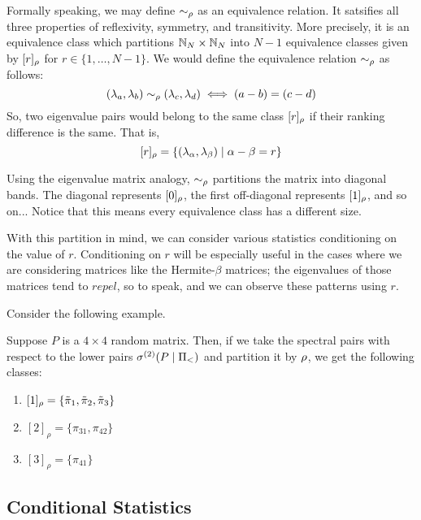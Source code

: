\begin{remark}
Formally speaking, we may define $\sim_{\rho}$ as an equivalence relation. It satsifies all three properties of reflexivity, symmetry, and transitivity. More precisely, it is an equivalence class which partitions $\mathbb{N}_N \times \mathbb{N}_N$ into $N - 1$ equivalence classes given by $[r]_{\rho}$ for $r \in \{1, \dots, N-1\}$. We would define the equivalence relation $\sim_{\rho}$ as follows:
$$(\lambda_a,\lambda_b) \sim_{\rho} (\lambda_c,\lambda_d) \iff (a -b) = (c-d)$$
So, two eigenvalue pairs would belong to the same class $[r]_{\rho}$ if their ranking difference is the same. That is,
$$[r]_{\rho} = \{(\lambda_\alpha, \lambda_\beta) \mid \alpha - \beta = r\}$$
\end{remark}

\begin{remark}
Using the eigenvalue matrix analogy, $\sim_{\rho}$ partitions the matrix into diagonal bands. The diagonal represents $[0]_{\rho}$, the first off-diagonal represents $[1]_{\rho}$, and so on... Notice that this means every equivalence class has a different size.
\end{remark}

With this partition in mind, we can consider various statistics conditioning on the value of $r$. Conditioning on $r$ will be especially useful in the cases where we are considering matrices like the Hermite-$\beta$ matrices; the eigenvalues of those matrices tend to $\textit{repel}$, so to speak, and we can observe these patterns using $r$.

Consider the following example.

\begin{example}
Suppose $P$ is a $4 \times 4$ random matrix. Then, if we take the spectral pairs with respect to the lower pairs ${\sigma^{(2)}}(P \mid \Pi_<)$ and partition it by ${\rho}$, we get the following classes:
\begin{enumerate}
  \item $[1]_\rho = \{{\tilde{\pi}}_1, {\tilde{\pi}}_2, {\tilde{\pi}}_3\}$
  \item $[2]_\rho = \{\pi_{31}, \pi_{42}\}$
  \item $[3]_\rho = \{\pi_{41}\}$
\end{enumerate}
\end{example}

\subsection{Conditional Statistics}

